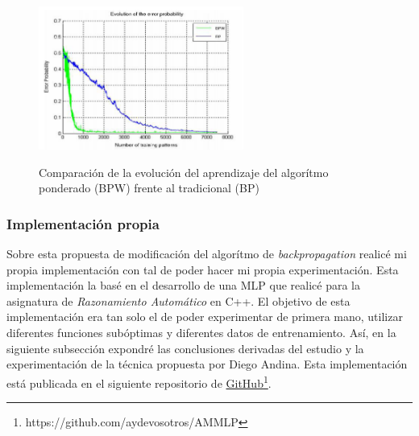 \documentclass[10pt,a4paper]{report}
\begin{document}
\begin{figure}[h!]{}
    \centering
    \includegraphics[width=0.6\textwidth]{img/ArticleResults.png}
    \label{fig:andinaResults}
    \caption{Comparación de la evolución del aprendizaje del algorítmo ponderado (BPW) frente al tradicional (BP)}
\end{figure}

\subsubsection{Implementación propia}
Sobre esta propuesta de modificación del algorítmo de \textit{backpropagation} realicé mi propia implementación con tal de poder hacer mi propia experimentación. Esta implementación la basé en el desarrollo de una MLP que realicé para la asignatura de \textit{Razonamiento Automático} en C++. El objetivo de esta implementación era tan solo el de poder experimentar de primera mano, utilizar diferentes funciones subóptimas y diferentes datos de entrenamiento. 
Así, en la siguiente subsección expondré las conclusiones derivadas del estudio y la experimentación de la técnica propuesta por Diego Andina.
 Esta implementación está publicada en el siguiente repositorio de \href{https://github.com/aydevosotros/AMMLP}{GitHub}\footnote{https://github.com/aydevosotros/AMMLP}.

\end{document}
